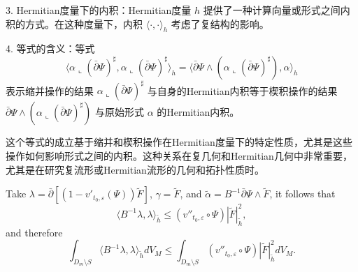\begin{remark}
3. Hermitian度量下的内积：Hermitian度量 \( h \) 提供了一种计算向量或形式之间内积的方式。在这种度量下，内积 \( \langle \cdot, \cdot \rangle_h \) 考虑了复结构的影响。

4. 等式的含义：等式
   \[ \langle \alpha \llcorner (\bar\partial\Psi)^\sharp, \alpha \llcorner (\bar\partial\Psi)^\sharp \rangle_h = \langle \bar\partial\Psi \wedge (\alpha \llcorner (\bar\partial\Psi)^\sharp), \alpha \rangle_h \]
   表示缩并操作的结果 \( \alpha \llcorner (\bar\partial\Psi)^\sharp \) 与自身的Hermitian内积等于楔积操作的结果 \( \bar\partial\Psi \wedge (\alpha \llcorner (\bar\partial\Psi)^\sharp) \) 与原始形式 \( \alpha \) 的Hermitian内积。

这个等式的成立基于缩并和楔积操作在Hermitian度量下的特定性质，尤其是这些操作如何影响形式之间的内积。这种关系在复几何和Hermitian几何中非常重要，尤其是在研究复流形或Hermitian流形的几何和拓扑性质时。
\end{remark}
Take
$\lambda=\bar{\partial}[(1-v'_{t_0,\varepsilon}(\Psi)){\tilde{F}}]$,
$\gamma=\tilde{F}$, and $\tilde{\alpha}=B^{-1}\bar\partial\Psi\wedge
\tilde{F}$, it follows that
$$\langle B^{-1}\lambda,\lambda\rangle_{\tilde{h}} \leq (v''_{t_0,\varepsilon}\circ{\Psi})| \tilde{F}|^2_{\tilde{h}},$$
 and therefore
 $$\int_{D_m\setminus S}\langle B^{-1}\lambda,\lambda\rangle_{\tilde{h}} dV_{M}\leq \int_{D_m\setminus S}
 (v''_{t_0,\varepsilon}
 \circ{\Psi})| \tilde{F}|^2_{\tilde{h}}dV_{M}.$$
 

